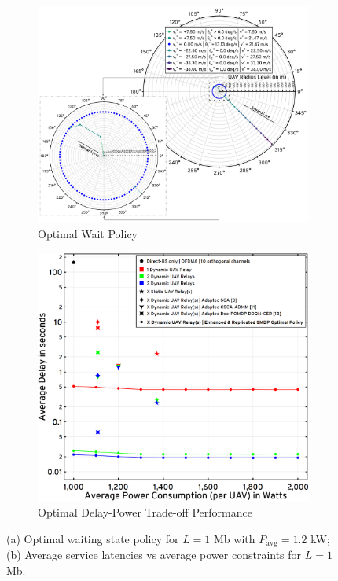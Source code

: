 \documentclass[10pt,twocolumn]{IEEEtran}
\begin{document}
\begin{figure} [t]
     \begin{subfigure}{0.531\linewidth}
         \centering
         \includegraphics[width=0.95\linewidth]{figs/Optimal_Waiting_Policy_1Mb.png}
         \vspace{-1mm}
         \caption{Optimal Wait Policy}
         \label{F7}
     \end{subfigure}
     \begin{subfigure}{0.474\linewidth}
         \centering
         \includegraphics[width=0.95\linewidth]{figs/Delay_Power_Tradeoff_1Mb.png}
         \vspace{-1mm}
         \caption{Optimal Delay-Power Trade-off Performance}
         \label{F8}
     \end{subfigure}
     \vspace{-1mm}
     \caption{(a) Optimal waiting state policy for $L{=}1$ Mb with $P_{\mathrm{avg}}{=}1.2$ kW; (b) Average service latencies vs average power constraints for $L{=}1$ Mb.}
     \label{F7andF8}
     \vspace{-6mm}
\end{figure}
\end{document}
